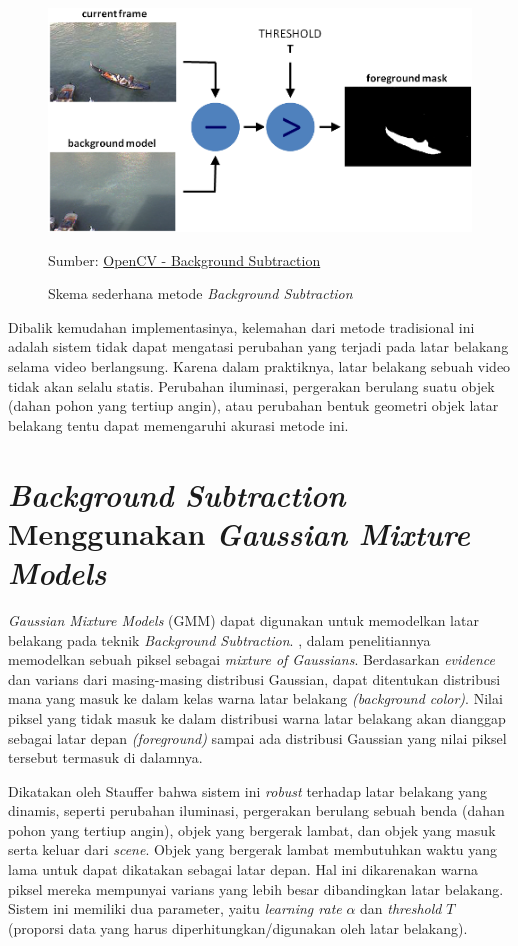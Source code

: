     \vspace{0.5cm}
    \begin{figure}[H]
    \centering
      \singlespacing
      \includegraphics{image/BS.png}
      \caption{Skema sederhana metode \textit{Background Subtraction}}
      \small{Sumber: \href{https://docs.opencv.org/4.5.3/d1/dc5/tutorial_background_subtraction.html}{OpenCV - Background Subtraction}}
      \label{fig:BS}
    \end{figure}
    
    Dibalik kemudahan implementasinya, kelemahan dari metode tradisional ini adalah sistem tidak dapat mengatasi perubahan yang terjadi pada latar belakang selama video berlangsung. Karena dalam praktiknya, latar belakang sebuah video tidak akan selalu statis. Perubahan iluminasi, pergerakan berulang suatu objek (dahan pohon yang tertiup angin), atau perubahan bentuk geometri objek latar belakang tentu dapat memengaruhi akurasi metode ini.

\section{\textit{Background Subtraction} Menggunakan \textit{Gaussian Mixture Models}}
    \textit{Gaussian Mixture Models} (GMM) dapat digunakan untuk memodelkan latar belakang pada teknik \textit{Background Subtraction}. \citet{Stauffer1999}, dalam penelitiannya memodelkan sebuah piksel sebagai \textit{mixture of Gaussians}. Berdasarkan \textit{evidence} dan varians dari masing-masing distribusi Gaussian, dapat ditentukan distribusi mana yang masuk ke dalam kelas warna latar belakang \textit{(background color)}. Nilai piksel yang tidak masuk ke dalam distribusi warna latar belakang akan dianggap sebagai latar depan \textit{(foreground)} sampai ada distribusi Gaussian yang nilai piksel tersebut termasuk di dalamnya.
    
    Dikatakan oleh Stauffer bahwa sistem ini \textit{robust} terhadap latar belakang yang dinamis, seperti perubahan iluminasi, pergerakan berulang sebuah benda (dahan pohon yang tertiup angin), objek yang bergerak lambat, dan objek yang masuk serta keluar dari \textit{scene}. Objek yang bergerak lambat membutuhkan waktu yang lama untuk dapat dikatakan sebagai latar depan. Hal ini dikarenakan warna piksel mereka mempunyai varians yang lebih besar dibandingkan latar belakang. Sistem ini memiliki dua parameter, yaitu \textit{learning rate} $\alpha$ dan \textit{threshold} $T$ (proporsi data yang harus diperhitungkan/digunakan oleh latar belakang).
    
